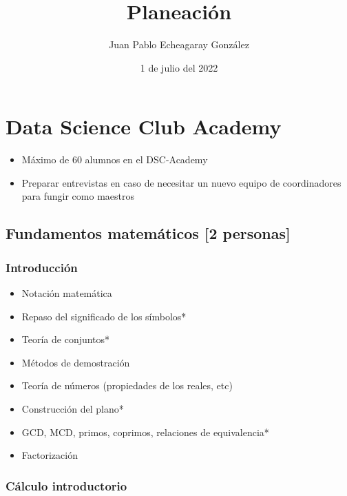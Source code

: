 \documentclass{article}
\title{Planeación}
\author{Juan Pablo Echeagaray González}
\date{1 de julio del 2022}
\begin{document}
    \begin{titlepage}
        \maketitle
    \end{titlepage}

    \tableofcontents
    \clearpage

    \section{Data Science Club Academy}

        \begin{itemize}
            \item Máximo de 60 alumnos en el DSC-Academy
            \item Preparar entrevistas en caso de necesitar un nuevo equipo de coordinadores para fungir como maestros
        \end{itemize}

        \subsection{Fundamentos matemáticos [2 personas]}

            \subsubsection{Introducción}

                \begin{itemize}
                    \item Notación matemática
                    \item Repaso del significado de los símbolos*
                    \item Teoría de conjuntos*
                    \item Métodos de demostración
                    \item Teoría de números (propiedades de los reales, etc)
                    \item Construcción del plano*
                    \item GCD, MCD, primos, coprimos, relaciones de equivalencia*
                    \item Factorización
                \end{itemize}

            \subsubsection{Cálculo introductorio}
\end{document}
